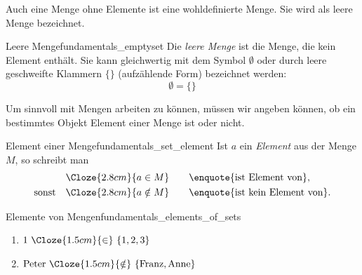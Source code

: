 Auch eine Menge ohne Elemente ist eine wohldefinierte Menge. Sie wird als
leere Menge bezeichnet.

\begin{DefinitionBox}{Leere Menge}{fundamentals_emptyset}
  Die \emph{leere Menge}  ist die Menge, die kein
  Element enthält. Sie kann gleichwertig mit dem Symbol $\emptyset$ oder durch
  leere geschweifte Klammern $\{\}$ (aufzählende Form) bezeichnet werden:
  \[
    \emptyset=\{\}
  \]
\end{DefinitionBox}



\begin{minipage}{\linewidth}
Um sinnvoll mit Mengen arbeiten zu können, müssen wir angeben können, ob ein
bestimmtes Objekt Element einer Menge ist oder nicht.

\begin{DefinitionBox}{Element einer Menge}{fundamentals_set_element}
  Ist $a$ ein \emph{Element}  aus der Menge $M$, so
  schreibt man
  \begin{align*}
    &\Cloze{2.8cm}{a\in M}
    \qquad \text{\enquote{ist Element von}}, \\
    \text{sonst} \quad
    &\Cloze{2.8cm}{a\notin M}
    \qquad\text{\enquote{ist kein Element von}}.
  \end{align*}
\end{DefinitionBox}

\begin{ExampleBox}{Elemente von Mengen}{fundamentals_elements_of_sets}
  \begin{enumerate}[label=(\alph*),itemsep=0.6em]
    \item $1\ \Cloze{1.5cm}{\in}\ \{1,2,3\}$
    \item $\text{Peter}\ \Cloze{1.5cm}{\notin}\
      \{\text{Franz},\text{Anne}\}$
  \end{enumerate}
\end{ExampleBox}
\end{minipage}





\clearpage


